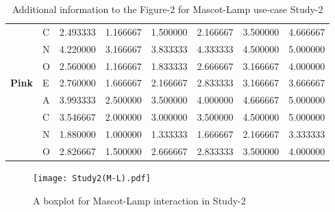 \begin{table}[H]
\begin{center}
\begin{tabular}{ |p{2cm}| p{0.5cm}|p{1.5cm}|p{1.5cm}| p{1.5cm}|p{1.5cm}|p{1.5cm}| p{1.5cm}| }
&C &2.493333 & 1.166667 &1.500000 &2.166667 &3.500000 &4.666667\\
&N &4.220000 & 3.166667 &3.833333 &4.333333 &4.500000 &5.000000\\
&O &2.560000 & 1.166667 &1.833333 &2.666667 &3.166667 &4.000000\\
 \hline 
 \hline 
 \multirow{5}{*}{\textbf{Pink}} 
&E &2.760000 & 1.666667 &2.166667 &2.833333 &3.166667 &3.666667\\
&A &3.993333 & 2.500000 &3.500000 &4.000000 &4.666667 &5.000000\\
&C &3.546667 & 2.000000 &3.000000 &3.500000 &4.500000 &5.000000\\
&N &1.880000 & 1.000000 &1.333333 &1.666667 &2.166667 &3.333333\\
&O &2.826667 & 1.500000 &2.666667 &2.833333 &3.500000 &4.000000\\
 \hline 
\end{tabular}
\end{center}
\caption{Additional information to the Figure-2 for Mascot-Lamp use-case Study-2}
\label{table:medianML2}
\end{table}

\begin{figure}[!htb]
  \centering
    \texttt{[image: Study2(M-L).pdf]}
    \label{fig:ML2}
      \caption{A boxplot for Mascot-Lamp interaction in Study-2}
\end{figure}

